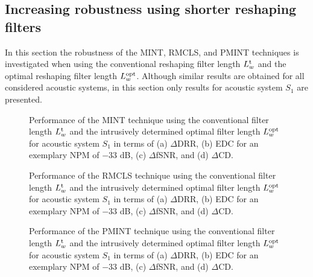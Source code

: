 \documentclass[twocolumn]{bmcart}%
\begin{document}
\subsection{Increasing robustness using shorter reshaping filters}
\label{sec: robustness_increase}
In this section the robustness of the MINT, RMCLS, and PMINT techniques is investigated when using the conventional reshaping filter length $L^{\rm t}_w$ and the optimal reshaping filter length $L_w^{\rm opt}$.
Although similar results are obtained for all considered acoustic systems, in this section only results for acoustic system $S_1$ are presented.
\begin{figure*}[t!]
\centering

\caption{Performance of the MINT technique using the conventional filter length $L^{\rm t}_w$ and the intrusively determined optimal filter length $L^{\rm opt}_w$ for acoustic system $S_1$ in terms of (a) $\Delta$DRR, (b) EDC for an exemplary NPM of $-33$ dB, (c) $\Delta$fSNR, and (d) $\Delta$CD.}
\label{fig: mint_lmint}
\end{figure*}
\begin{figure*}[t!]
\centering

\caption{Performance of the RMCLS technique using the conventional filter length $L^{\rm t}_w$ and the intrusively determined optimal filter length $L^{\rm opt}_w$ for acoustic system $S_1$ in terms of (a) $\Delta$DRR, (b) EDC for an exemplary NPM of $-33$ dB, (c) $\Delta$fSNR, and (d) $\Delta$CD.}
\label{fig: rmcls_lrmcls}
\end{figure*}
\begin{figure*}[t!]
\centering

\caption{Performance of the PMINT technique using the conventional filter length $L^{\rm t}_w$ and the intrusively determined optimal filter length $L^{\rm opt}_w$ for acoustic system $S_1$ in terms of (a) $\Delta$DRR, (b) EDC for an exemplary NPM of $-33$ dB, (c) $\Delta$fSNR, and (d) $\Delta$CD.}
\label{fig: pmint_lpmint}
\end{figure*}
\end{document}

